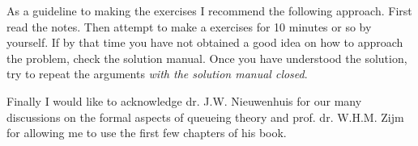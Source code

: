 As a guideline to making the exercises I recommend the following
approach.  First read the notes. Then attempt to make a exercises for
10 minutes or so by yourself. If by that time you have not obtained a
good idea on how to approach the problem, check the solution
manual. Once you have understood the solution, try to repeat the
arguments \emph{with the solution manual closed}.


Finally I would like to acknowledge dr. J.W. Nieuwenhuis for our many
discussions on the formal aspects of queueing theory and
prof. dr. W.H.M. Zijm for allowing me to use the first few chapters of
his book. 


